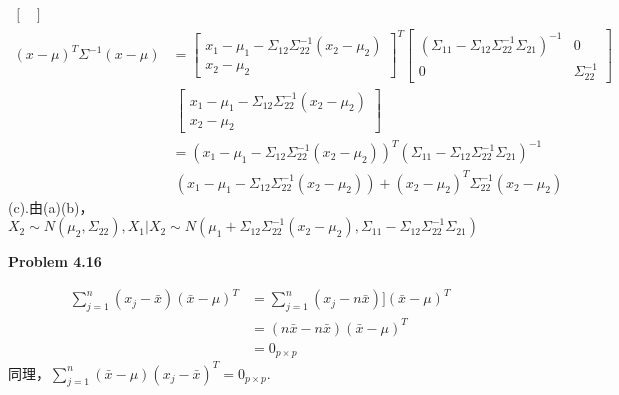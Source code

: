\documentclass[UTF8,12pt]{article}
\newenvironment{problem}[2][Problem]
{ \begin{mdframed}[backgroundcolor=gray!20] \textbf{#1 #2}}
	{  \end{mdframed}}
\newenvironment{answer}
{}
{}
\newenvironment{eq}
{
	\begin{equation}
		\begin{aligned}\nonumber
}
{
		\end{aligned}
	\end{equation}
}
\begin{document}
\begin{answer}
\begin{eq}
\begin{bmatrix}
		\end{bmatrix}\\
		(x-\mu)^T\Sigma^{-1}(x-\mu) 
		&= \begin{bmatrix}
			x_1-\mu_1-\Sigma_{12}\Sigma_{22}^{-1}(x_2-\mu_2) \\
			x_2 - \mu_2
		\end{bmatrix}^T
		\begin{bmatrix}
			(\Sigma_{11}-\Sigma_{12}\Sigma_{22}^{-1}\Sigma_{21})^{-1} &  0\\
			0 & \Sigma_{22}^{-1}
		\end{bmatrix}\\
		&\ \begin{bmatrix}
			x_1-\mu_1-\Sigma_{12}\Sigma_{22}^{-1}(x_2-\mu_2) \\
			x_2 - \mu_2
		\end{bmatrix}\\
		&=(x_1-\mu_1-\Sigma_{12}\Sigma_{22}^{-1}(x_2-\mu_2))^T 
		(\Sigma_{11}-\Sigma_{12}\Sigma_{22}^{-1}\Sigma_{21})^{-1}\\
		&\ (x_1-\mu_1-\Sigma_{12}\Sigma_{22}^{-1}(x_2-\mu_2))
		+ (x_2 - \mu_2)^T\Sigma_{22}^{-1} (x_2 - \mu_2)
	\end{eq}
	(c).由(a)(b)，$X_2\sim N(\mu_2,\Sigma_{22}),
	X_1|X_2 \sim N(\mu_1 +\Sigma_{12}\Sigma_{22}^{-1}(x_2-\mu_2), 
	\Sigma_{11}-\Sigma_{12}\Sigma_{22}^{-1}\Sigma_{21})$
\end{answer}

\begin{problem}{4.16}
\end{problem}
\begin{answer}
	\begin{eq}
		\sum_{j=1}^n (x_j-\bar{x})(\bar{x}-\mu)^T
		&= \sum_{j=1}^n (x_j-n\bar{x})](\bar{x}-\mu)^T\\
		&= (n\bar{x}-n\bar{x})(\bar{x}-\mu)^T\\
		&= 0_{p\times p}
	\end{eq}
	同理，$\sum_{j=1}^n (\bar{x}-\mu)(x_j-\bar{x})^T = 0_{p\times p}$.
\end{answer}
\end{document}
